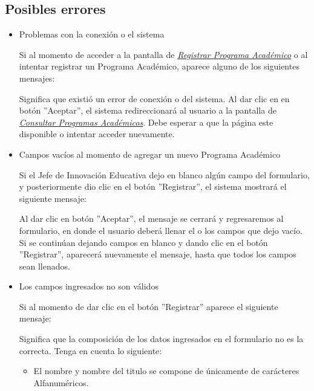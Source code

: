        \subsection{Posibles errores}
            \begin{itemize}
            
            	\item Problemas con la conexión o el sistema
                
                	Si al momento de acceder a la pantalla de \hyperlink{registrarpa}{\textit{Registrar Programa Académico}} o al intentar registrar un Programa Académico, aparece alguno de los siguientes mensajes:
                
                	Significa que existió un error de conexión o del sistema. Al dar clic en en botón ''Aceptar'', el sistema redireccionará al usuario a la pantalla de \hyperlink{consultarpa}{\textit{Consultar Programas Académicos}}. Debe esperar a que la página este disponible o intentar acceder nuevamente.
                
            	\item Campos vacíos al momento de agregar un nuevo Programa Académico
            
                	Si el Jefe de Innovación Educativa dejo en blanco algún campo del formulario, y posteriormente dio clic en el botón ''Registrar'', el sistema mostrará el siguiente mensaje:
                
                	Al dar clic en botón ''Aceptar'', el mensaje se cerrará y regresaremos al formulario, en donde el usuario deberá llenar el o los campos que dejo vacío. Si se continúan dejando campos en blanco y dando clic en el botón ''Registrar'', aparecerá nuevamente el mensaje, hasta que todos los campos sean llenados.\\
                
            
            	\item Los campos ingresados no son válidos
    
                	Si al momento de dar clic en el botón ''Registrar'' aparece el siguiente mensaje:
            
                	Significa que la composición de los datos ingresados en el formulario no es la correcta. Tenga en cuenta lo siguiente:
            
                	\begin{itemize}
                		\item El nombre y nombre del titulo se compone de únicamente de carácteres Alfanuméricos.
                	\end{itemize}
            
            \end{itemize}

